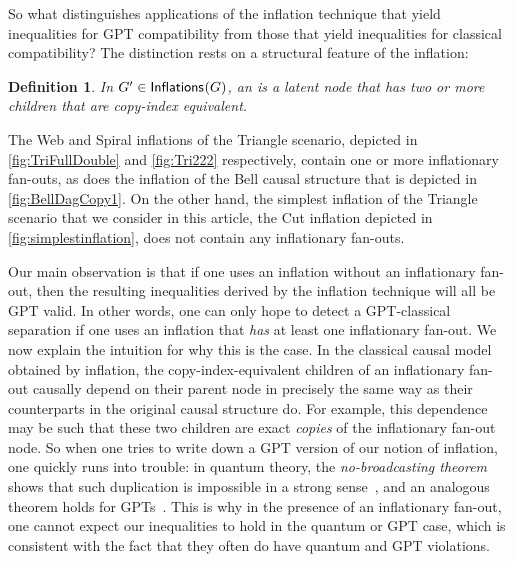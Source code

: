 \documentclass[aps,english,10pt,superscriptaddress,onecolumn,twoside,longbibliography,pra,floatfix,fleqn,nofootinbib]{revtex4-1}
\newcommand*{\tblue}[1]{{\color{medblue}{\textbf{#1}}}}
\newtheorem{definition}[theorem]{Definition}
\theoremstyle{definition}
\newcounter{example}[section]
\newcommand{\SmallNamedFunction}[3][]{\operatorname{\mathsf{#2}}_{#1}\parenths{#3}}
\newcommand{\inflations}[1]{\SmallNamedFunction{Inflations}{#1}}
\DeclarePairedDelimiter{\parenths}{\lparen}{\rparen}
\begin{document}
So what distinguishes applications of the inflation technique that yield inequalities for GPT compatibility from those that yield inequalities for classical compatibility?   The distinction rests on a structural feature of the inflation:

\begin{definition}
In $G'\in\inflations{G}$, an \tblue{inflationary fan-out} is a latent node that has two or more children that are copy-index equivalent.  
\end{definition}

 The Web and Spiral inflations of the Triangle scenario, depicted in \cref{fig:TriFullDouble} and \cref{fig:Tri222} respectively,
contain one or more inflationary fan-outs, as does the inflation of the Bell causal structure that is depicted in \cref{fig:BellDagCopy1}.  On the other hand, the simplest inflation of the Triangle scenario that we consider in this article, the Cut inflation depicted in \cref{fig:simplestinflation}, does not contain any inflationary fan-outs.

Our main observation is that if one uses an inflation without an inflationary fan-out, then the resulting inequalities derived by the inflation technique will all be GPT valid. In other words, one can only hope to detect a GPT-classical separation if one uses an inflation that \emph{has} at least one inflationary fan-out. We now explain the intuition for why this is the case. 
In the classical causal model obtained by inflation, the copy-index-equivalent children of an inflationary fan-out causally depend on their parent node in precisely the same way as their counterparts in the original causal structure do. For example, this dependence may be such that these two children are exact \emph{copies} of the inflationary fan-out node. So when one tries to write down a GPT version of our notion of inflation, one quickly runs into trouble: in quantum theory, the {\em no-broadcasting theorem} shows that such duplication is impossible in a strong sense~\cite{NoCloningQuantum1996}, and an analogous theorem holds for GPTs~\cite{NoCloningGeneral2006}. This is why in the presence of an inflationary fan-out, one cannot expect our inequalities to hold in the quantum or GPT case, which is consistent with the fact that they often do have quantum and GPT violations.
\end{document}
